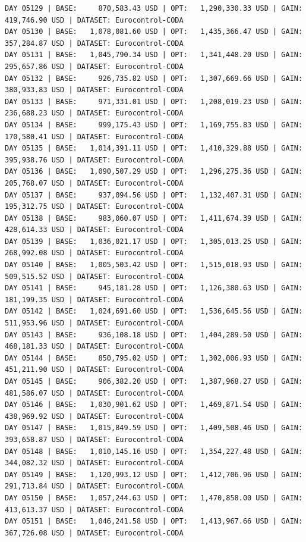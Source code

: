 \documentclass[11pt,a4paper]{article}
\begin{document}
\begin{verbatim}
DAY 05129 | BASE:     870,583.43 USD | OPT:   1,290,330.33 USD | GAIN: 419,746.90 USD | DATASET: Eurocontrol-CODA
DAY 05130 | BASE:   1,078,081.60 USD | OPT:   1,435,366.47 USD | GAIN: 357,284.87 USD | DATASET: Eurocontrol-CODA
DAY 05131 | BASE:   1,045,790.34 USD | OPT:   1,341,448.20 USD | GAIN: 295,657.86 USD | DATASET: Eurocontrol-CODA
DAY 05132 | BASE:     926,735.82 USD | OPT:   1,307,669.66 USD | GAIN: 380,933.83 USD | DATASET: Eurocontrol-CODA
DAY 05133 | BASE:     971,331.01 USD | OPT:   1,208,019.23 USD | GAIN: 236,688.23 USD | DATASET: Eurocontrol-CODA
DAY 05134 | BASE:     999,175.43 USD | OPT:   1,169,755.83 USD | GAIN: 170,580.41 USD | DATASET: Eurocontrol-CODA
DAY 05135 | BASE:   1,014,391.11 USD | OPT:   1,410,329.88 USD | GAIN: 395,938.76 USD | DATASET: Eurocontrol-CODA
DAY 05136 | BASE:   1,090,507.29 USD | OPT:   1,296,275.36 USD | GAIN: 205,768.07 USD | DATASET: Eurocontrol-CODA
DAY 05137 | BASE:     937,094.56 USD | OPT:   1,132,407.31 USD | GAIN: 195,312.75 USD | DATASET: Eurocontrol-CODA
DAY 05138 | BASE:     983,060.07 USD | OPT:   1,411,674.39 USD | GAIN: 428,614.33 USD | DATASET: Eurocontrol-CODA
DAY 05139 | BASE:   1,036,021.17 USD | OPT:   1,305,013.25 USD | GAIN: 268,992.08 USD | DATASET: Eurocontrol-CODA
DAY 05140 | BASE:   1,005,503.42 USD | OPT:   1,515,018.93 USD | GAIN: 509,515.52 USD | DATASET: Eurocontrol-CODA
DAY 05141 | BASE:     945,181.28 USD | OPT:   1,126,380.63 USD | GAIN: 181,199.35 USD | DATASET: Eurocontrol-CODA
DAY 05142 | BASE:   1,024,691.60 USD | OPT:   1,536,645.56 USD | GAIN: 511,953.96 USD | DATASET: Eurocontrol-CODA
DAY 05143 | BASE:     936,108.18 USD | OPT:   1,404,289.50 USD | GAIN: 468,181.33 USD | DATASET: Eurocontrol-CODA
DAY 05144 | BASE:     850,795.02 USD | OPT:   1,302,006.93 USD | GAIN: 451,211.90 USD | DATASET: Eurocontrol-CODA
DAY 05145 | BASE:     906,382.20 USD | OPT:   1,387,968.27 USD | GAIN: 481,586.07 USD | DATASET: Eurocontrol-CODA
DAY 05146 | BASE:   1,030,901.62 USD | OPT:   1,469,871.54 USD | GAIN: 438,969.92 USD | DATASET: Eurocontrol-CODA
DAY 05147 | BASE:   1,015,849.59 USD | OPT:   1,409,508.46 USD | GAIN: 393,658.87 USD | DATASET: Eurocontrol-CODA
DAY 05148 | BASE:   1,010,145.16 USD | OPT:   1,354,227.48 USD | GAIN: 344,082.32 USD | DATASET: Eurocontrol-CODA
DAY 05149 | BASE:   1,120,993.12 USD | OPT:   1,412,706.96 USD | GAIN: 291,713.84 USD | DATASET: Eurocontrol-CODA
DAY 05150 | BASE:   1,057,244.63 USD | OPT:   1,470,858.00 USD | GAIN: 413,613.37 USD | DATASET: Eurocontrol-CODA
DAY 05151 | BASE:   1,046,241.58 USD | OPT:   1,413,967.66 USD | GAIN: 367,726.08 USD | DATASET: Eurocontrol-CODA

\end{verbatim}
\end{document}
